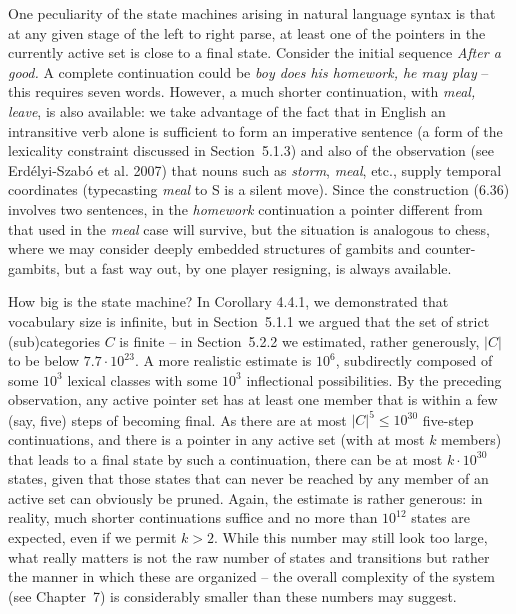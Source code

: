 One peculiarity of the state machines arising in natural language syntax is
that at any given stage of the left to right parse, at least one of the
pointers in the currently active set is close to a final state.  Consider the
initial sequence {\it After a good.} A complete continuation could be {\it boy
  does his homework, he may play} -- this requires seven words. However, a
much shorter continuation, with {\it meal, leave}, is also available: we take
advantage of the fact that in English an intransitive verb alone is sufficient
to form an imperative sentence (a form of the lexicality constraint discussed
in Section~5.1.3) and also of the observation (see Erd\'elyi-Szab\'o et al.
2007) \nocite{Szabo1:2007}that nouns such as {\it storm}, {\it meal},
etc., supply temporal coordinates (typecasting {\it meal} to S is a silent
move).  Since the construction (6.36) involves two sentences, in the {\it
  homework} continuation a pointer different from that used in the {\it meal}
case will survive, but the situation is analogous to chess, where we may
consider deeply embedded structures of gambits and counter-gambits, but a fast
way out, by one player resigning, is always available.

How big is the state machine? In Corollary 4.4.1, we demonstrated that
vocabulary size is infinite, but in Section~5.1.1 we argued that the set of
strict (sub)categories $C$ is finite -- in Section~5.2.2 we estimated, rather
generously, $|C|$ to be below $7.7\cdot 10^{23}$. A more realistic estimate is
$10^6$, subdirectly composed of some $10^3$ lexical classes with some $10^3$
inflectional possibilities. By the preceding observation, any active pointer
set has at least one member that is within a few (say, five) steps of becoming
final.  As there are at most $|C|^5 \leq 10^{30}$ five-step continuations, and
there is a pointer in any active set (with at most $k$ members) that leads to
a final state by such a continuation, there can be at most $k\cdot 10^{30}$
states, given that those states that can never be reached by any member of an
active set can obviously be pruned. Again, the estimate is rather generous: in
reality, much shorter continuations suffice and no more than $10^{12}$ states
are expected, even if we permit $k > 2$. While this number may still look too
large, what really matters is not the raw number of states and transitions but
rather the manner in which these are organized -- the overall complexity of
the system (see Chapter~7) is considerably smaller than these numbers may
suggest.

